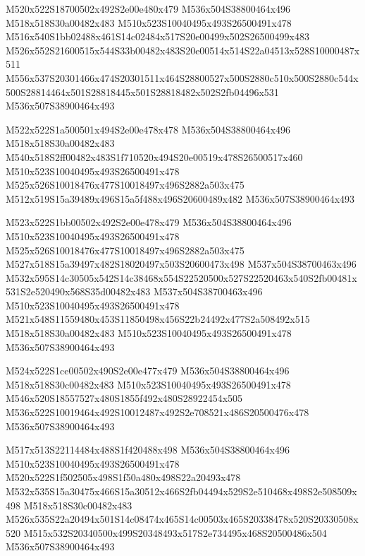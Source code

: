 \documentclass{article}
\begin{document}
\begin{multicols}{5}
\begin{center}

M520x522S18700502x492S2e00e480x479 %
M536x504S38800464x496 %
M518x518S30a00482x483 %
M510x523S10040495x493S26500491x478 %
M516x540S1bb02488x461S14c02484x517S20e00499x502S26500499x483 %
M526x552S21600515x544S33b00482x483S20e00514x514S22a04513x528S10000487x511 %
M556x537S20301466x474S20301511x464S28800527x500S2880c510x500S2880c544x500S28814464x501S28818445x501S28818482x502S2fb04496x531 %
M536x507S38900464x493 %
\vfil
\columnbreak

M522x522S1a500501x494S2e00e478x478 %
M536x504S38800464x496 %
M518x518S30a00482x483 %
M540x518S2ff00482x483S1f710520x494S20e00519x478S26500517x460 %
M510x523S10040495x493S26500491x478 %
M525x526S10018476x477S10018497x496S2882a503x475 %
M512x519S15a39489x496S15a5f488x496S20600489x482 %
M536x507S38900464x493 %
\vfil
\columnbreak

M523x522S1bb00502x492S2e00e478x479 %
M536x504S38800464x496 %
M510x523S10040495x493S26500491x478 %
M525x526S10018476x477S10018497x496S2882a503x475 %
M527x518S15a39497x482S18020497x503S20600473x498 %
M537x504S38700463x496 %
M532x595S14c30505x542S14c38468x554S22520500x527S22520463x540S2fb00481x531S2e520490x568S35d00482x483 %
M537x504S38700463x496 %
M510x523S10040495x493S26500491x478 %
M521x548S11559480x453S11850498x456S22b24492x477S2a508492x515 %
M518x518S30a00482x483 %
M510x523S10040495x493S26500491x478 %
M536x507S38900464x493 %
\vfil
\columnbreak

M524x522S1ce00502x490S2e00e477x479 %
M536x504S38800464x496 %
M518x518S30c00482x483 %
M510x523S10040495x493S26500491x478 %
M546x520S18557527x480S1855f492x480S28922454x505 %
M536x522S10019464x492S10012487x492S2e708521x486S20500476x478 %
M536x507S38900464x493 %
\vfil
\columnbreak

M517x513S22114484x488S1f420488x498 %
M536x504S38800464x496 %
M510x523S10040495x493S26500491x478 %
M520x522S1f502505x498S1f50a480x498S22a20493x478 %
M532x535S15a30475x466S15a30512x466S2fb04494x529S2e510468x498S2e508509x498 %
M518x518S30c00482x483 %
M526x535S22a20494x501S14c08474x465S14c00503x465S20338478x520S20330508x520 %
M515x532S20340500x499S20348493x517S2e734495x468S20500486x504 %
M536x507S38900464x493 %
\vfil

\end{center}
\end{multicols}
\end{document}
